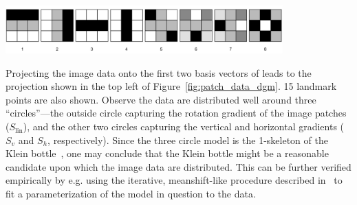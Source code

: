 \documentclass{siamart190516}
\begin{document}
\begin{center}
	\includegraphics[width=0.80\textwidth]{dct_basis} 
\end{center}
\noindent Projecting the image data onto the first two basis vectors of leads to the projection shown in the top left of Figure~\ref{fig:patch_data_dgm}. 15 landmark points are also shown. Observe the data are distributed well around three ``circles''---the outside circle capturing the rotation gradient of the image patches ($S_{\mathrm{lin}}$), and the other two circles capturing the vertical and horizontal gradients ($S_v$ and $S_h$, respectively). Since the three circle model is the 1-skeleton of the Klein bottle~\cite{carlsson2008local}, one may conclude that the Klein bottle might be a reasonable candidate upon which the image data are distributed. This can be further verified empirically by e.g. using the iterative, meanshift-like procedure described in~\cite{carlsson2008local} to fit a parameterization of the model in question to the data. 
\end{document}
